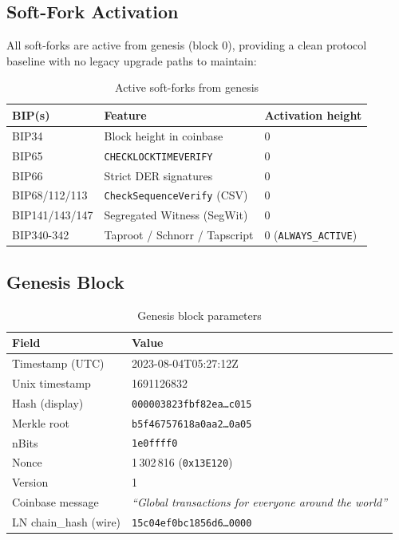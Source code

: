 \documentclass[12pt, a4paper]{article}
\begin{document}
\subsection{Soft-Fork Activation}

All soft-forks are active from genesis (block 0), providing a clean protocol
baseline with no legacy upgrade paths to maintain:

\begin{table}[h!]
\centering
\caption{Active soft-forks from genesis}
\begin{tabular}{@{}lll@{}}
\toprule
\textbf{BIP(s)} & \textbf{Feature} & \textbf{Activation height} \\
\midrule
BIP34               & Block height in coinbase         & 0 \\
BIP65               & \texttt{CHECKLOCKTIMEVERIFY}     & 0 \\
BIP66               & Strict DER signatures            & 0 \\
BIP68/112/113       & \texttt{CheckSequenceVerify} (CSV) & 0 \\
BIP141/143/147      & Segregated Witness (SegWit)      & 0 \\
BIP340-342          & Taproot / Schnorr / Tapscript    & 0 (\texttt{ALWAYS\_ACTIVE}) \\
\bottomrule
\end{tabular}
\end{table}

\subsection{Genesis Block}

\begin{table}[h!]
\centering
\caption{Genesis block parameters}
\begin{tabular}{@{}ll@{}}
\toprule
\textbf{Field} & \textbf{Value} \\
\midrule
Timestamp (UTC) & 2023-08-04T05:27:12Z \\
Unix timestamp  & 1691126832 \\
Hash (display)  & \texttt{000003823fbf82ea\ldots c015} \\
Merkle root     & \texttt{b5f46757618a0aa2\ldots 0a05} \\
nBits           & \texttt{1e0ffff0} \\
Nonce           & 1\,302\,816 (\texttt{0x13E120}) \\
Version         & 1 \\
Coinbase message & \textit{``Global transactions for everyone around the world''} \\
LN chain\_hash (wire) & \texttt{15c04ef0bc1856d6\ldots 0000} \\
\bottomrule
\end{tabular}
\end{table}
\end{document}
